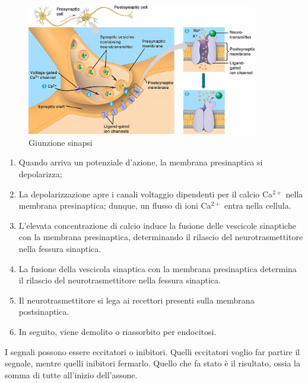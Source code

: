 \documentclass[a4paper]{article}
\begin{document}
\begin{center}
\begin{figure}[ht]
    \centering
    \includegraphics[width=0.9\textwidth]{./giunzione_sinapsi.png}
    \caption{Giunzione sinapsi}
\end{figure}
\end{center}

\begin{enumerate}
    \item Quando arriva un potenziale d'azione, la membrana presinaptica si depolarizza;
    \item La depolarizzazione apre i canali voltaggio dipendenti per il calcio Ca\({}^{2+}\) nella membrana
        presinaptica; dunque, un flusso di ioni Ca\({}^{2+}\) entra nella cellula.
    \item L'elevata concentrazione di calcio induce la fusione delle vescicole sinaptiche con la
        membrana presinaptica, determinando il rilascio del neurotrasmettitore nella fessura
        sinaptica.
    \item La fusione della vescicola sinaptica con la membrana presinaptica determina il rilascio del
    neurotrasmettitore nella fessura sinaptica.
    \item Il neurotrasmettitore si lega ai recettori presenti sulla membrana postsinaptica.
    \item In seguito, viene demolito o riassorbito per endocitosi.
\end{enumerate}

\pagebreak

I segnali possono essere eccitatori o inibitori.
Quelli eccitatori voglio far partire il segnale, mentre quelli inibitori
fermarlo. Quello che fa stato è il risultato, ossia la somma di tutte
all'inizio dell'assone.

\end{document}

